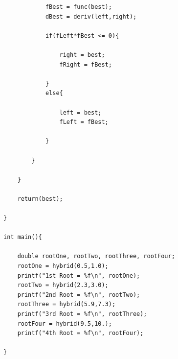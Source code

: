 \documentclass[12pt]{article}
\begin{document}
\begin{verbatim}
			fBest = func(best);
			dBest = deriv(left,right);

			if(fLeft*fBest <= 0){

				right = best;
				fRight = fBest;

			}
			else{

				left = best;
				fLeft = fBest;

			}

		}

	}

	return(best);

}

int main(){

	double rootOne, rootTwo, rootThree, rootFour;
	rootOne = hybrid(0.5,1.0);
	printf("1st Root = %f\n", rootOne);
	rootTwo = hybrid(2.3,3.0);
	printf("2nd Root = %f\n", rootTwo);
	rootThree = hybrid(5.9,7.3);
	printf("3rd Root = %f\n", rootThree);
	rootFour = hybrid(9.5,10.);
	printf("4th Root = %f\n", rootFour);

}
\end{verbatim}
\end{document}
